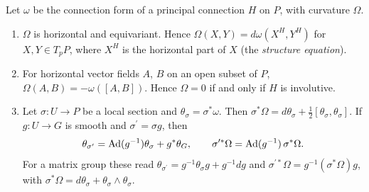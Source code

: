 \begin{proposition}\label{connections:proposition-principal-curvature}
Let $\omega$ be the connection form of a principal connection $H$ on $P$, with curvature $\Omega$.
\begin{enumerate}
\item $\Omega$ is horizontal and equivariant. Hence $\Omega(X, Y) = d\omega(X^H, Y^H)$ for $X, Y \in T_pP$, where $X^H$ is the horizontal part of $X$ (the \emph{structure equation}).
\item For horizontal vector fields $A$, $B$ on an open subset of $P$, $\Omega(A, B) = -\omega([A, B])$. Hence $\Omega = 0$ if and only if $H$ is involutive.
\item Let $\sigma \colon U \to P$ be a local section and $\theta_\sigma = \sigma^*\omega$. Then $\sigma^*\Omega = d\theta_\sigma + \frac12[\theta_\sigma, \theta_\sigma]$. If $g \colon U \to G$ is smooth and
$\sigma^{\prime} = \sigma g$, then
\[
\theta_{\sigma^{\prime}} = \operatorname{Ad}(g^{-1})\theta_\sigma + g^*\theta_G, \qquad \sigma^{\prime*}\Omega = \operatorname{Ad}(g^{-1})\,\sigma^*\Omega .
\]
For a matrix group these read $\theta_{\sigma^{\prime}} = g^{-1}\theta_\sigma g + g^{-1}dg$ and $\sigma^{\prime*}\Omega = g^{-1}(\sigma^*\Omega)g$, with $\sigma^*\Omega = d\theta_\sigma + \theta_\sigma \wedge \theta_\sigma$.
\end{enumerate}
\end{proposition}

